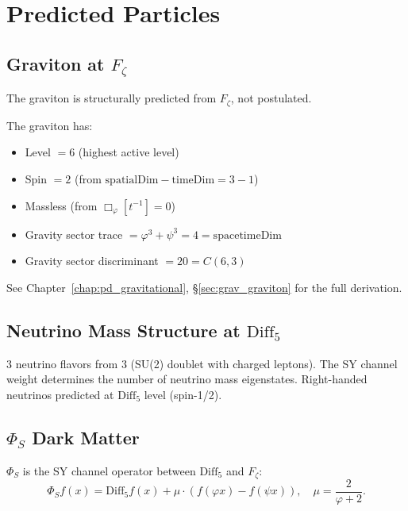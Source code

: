 \section{Predicted Particles}
\label{sec:particle_predictions}

\subsection{Graviton at \texorpdfstring{$F_\zeta$}{Fζ}}

The graviton is structurally predicted from $F_\zeta$, not postulated.

\begin{theorem}
\label{thm:graviton_structural}
\leanok
The graviton has:
\begin{itemize}
\item Level $= 6$ (highest active level)
\item Spin $= 2$ (from $\mathrm{spatialDim} - \mathrm{timeDim} = 3 - 1$)
\item Massless (from $\Box_\varphi[t^{-1}] = 0$)
\item Gravity sector trace $= \varphi^3 + \psi^3 = 4 = \mathrm{spacetimeDim}$
\item Gravity sector discriminant $= 20 = C(6,3)$
\end{itemize}
See Chapter~\ref{chap:pd_gravitational}, \S\ref{sec:grav_graviton} for the full derivation.
\end{theorem}

\subsection{Neutrino Mass Structure at \texorpdfstring{$\mathrm{Diff}_5$}{Diff5}}

\begin{theorem}
\label{thm:neutrino_kernel}
3 neutrino flavors from $3$ (SU(2) doublet with charged leptons).
The SY channel weight determines the number of neutrino mass eigenstates.
Right-handed neutrinos predicted at $\mathrm{Diff}_5$ level (spin-1/2).
\end{theorem}

\subsection{\texorpdfstring{$\Phi_S$}{Φ_S} Dark Matter}

$\Phi_S$ is the SY channel operator between $\mathrm{Diff}_5$ and $F_\zeta$:
\[
\Phi_S f(x) = \mathrm{Diff}_5 f(x) + \mu \cdot (f(\varphi x) - f(\psi x)), \quad \mu = \frac{2}{\varphi + 2}.
\]

